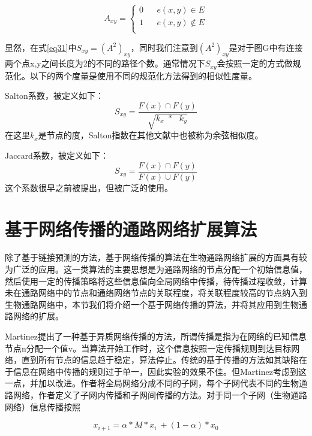 \begin{equation}
  A_{xy}=\left\{
 \begin{array}{rcl}
 0      &      & {e(x,y) \in E}\\
 1      &      & {e(x,y) \notin E}\\
 \end{array} \right. 
\end{equation}

显然，在式\ref{eq31}中$S_{xy}=(A^2)_{xy}$，同时我们注意到$(A^2)_{xy}$是对于图G中有连接两个点x,y之间长度为2的不同的路径个数。通常情况下$S_{xy}$会按照一定的方式做规范化。以下的两个度量是使用不同的规范化方法得到的相似性度量。

Salton系数，被定义如下：
\begin{equation}
S_{xy} =\frac{F( x) \cap F( y)}{\sqrt{k_{x\ \ } *\ \ \ k_{y}}}
\end{equation}
在这里$k_{x}$是节点的度，Salton指数在其他文献中也被称为余弦相似度。

Jaccard系数，被定义如下：
\begin{equation}
S_{xy} =\frac{F( x) \cap F( y)}{F( x) \cup F( y)}
\end{equation}
这个系数很早之前被提出，但被广泛的使用。

\section{基于网络传播的通路网络扩展算法}
除了基于链接预测的方法，基于网络传播的算法在生物通路网络扩展的方面具有较为广泛的应用。这一类算法的主要思想是为通路网络的节点分配一个初始信息值，然后使用一定的传播策略将这些信息值向全局网络中传播，待传播过程收敛，计算未在通路网络中的节点和通络网络节点的关联程度，将关联程度较高的节点纳入到生物通路网络中，本节我们将介绍一个基于网络传播的算法，并将其应用到生物通路网络的扩展。

Martinez\cite{martinez2015drugnet}提出了一种基于异质网络传播的方法，所谓传播是指为在网络的已知信息节点n分配一个值v。当算法开始工作时，这个信息按照一定传播规则到达目标网络，直到所有节点的信息趋于稳定，算法停止。传统的基于传播的方法如\cite{vanunu2010associating}其缺陷在于信息在网络中传播的规则过于单一，因此实验的效果不佳。但Martinez\cite{martinez2015drugnet}考虑到这一点，并加以改进。作者将全局网络分成不同的子网，每个子网代表不同的生物通路网络，作者定义了子网内传播和子网间传播的方法。对于同一个子网（生物通路网络）信息传播按照

\begin{equation}
x_{i+1} =\alpha *M*x_{i} \ +( 1-\alpha ) *x_{0}
\label{eq321}
\end{equation}

